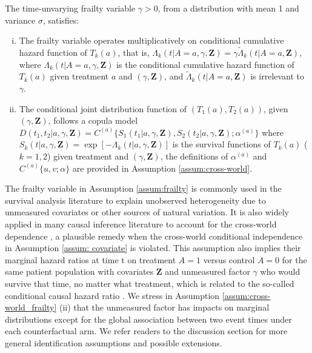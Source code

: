 \documentclass[APA,Times1COL]{WileyNJDv5} %
\theoremstyle{plain}
\def\red #1{{\color{red}{#1}}}
\def\bfZ{\mathbf{Z}}
\def\Pr{\operatorname{Pr}}
\begin{document}
\begin{assumption}
The time-unvarying frailty variable $\gamma>0$, from a distribution with mean 1 and variance $\sigma$, satisfies:
\begin{enumerate}[(i)]
\item The frailty variable operates multiplicatively on conditional cumulative hazard function of $T_k(a)$, that is, $\Lambda_k(t|A=a,\gamma,\bfZ) = \gamma\widetilde{\Lambda}_k(t|A=a,\bfZ)$,
where $\Lambda_k(t|A=a,\gamma,\bfZ) $ is the conditional cumulative hazard function of $T_k(a)$ given treatment $a$ and $(\gamma,\bfZ)$, and $\widetilde{\Lambda}_k(t|A=a,\bfZ)$ is irrelevant to $\gamma$.
\item The conditional joint distribution function of $(T_1(a),T_2(a))$, given $(\gamma,\bfZ)$, follows a copula model 
$D(t_1,t_2|a,\gamma,\bfZ) 
= C^{(a)}\{S_1(t_1|a,\gamma,\bfZ),S_2(t_2|a,\gamma,\bfZ);\alpha^{(a)}\}$ %
where $S_k(t|a,\gamma,\bfZ)=\exp[-\Lambda_k(t|a,\gamma,\bfZ)]$ is the survival functions of $T_k(a)$ ($k=1,2$) given treatment and $(\gamma,\bfZ)$, the definitions of $\alpha^{(a)}$ and $C^{(a)}\{u,v;\alpha\}$ are provided in Assumption \ref{assum:cross-world}.
\end{enumerate}
\label{assum:cross-world_frailty}
\end{assumption}

The frailty variable in Assumption \ref{assum:frailty} is commonly used in the survival analysis literature to explain unobserved heterogeneity due to unmeasured covariates or other sources of natural variation.  It is also widely applied in many causal inference literature to account for the cross-world dependence \citep{aalen2015does,martinussen2020subtleties,axelrod2022sensitivity}, a plausible remedy when the cross-world conditional independence in Assumption \ref{assum: covariate} is violated. 
This assumption also implies their marginal hazard ratios at time t on treatment $A=1$ versus control $A=0$ for the same patient population with covariates $\bfZ$ and unmeasured factor $\gamma$ who would survive that time, no matter what treatment, which is related to the so-called conditional causal hazard ratio \citep{martinussen2020subtleties}.
We stress in Assumption \ref{assum:cross-world_frailty} (ii) that the unmeasured factor has impacts on marginal distributions except for the global association between two event times under each counterfactual arm. We refer readers to the discussion section for more general identification assumptions and possible extensions.
\end{document}
